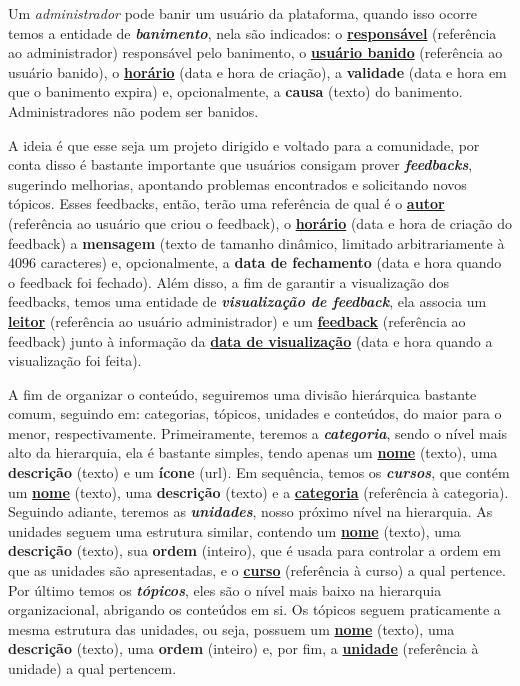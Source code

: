 
Um \textit{administrador} pode banir um usuário da plataforma, quando isso
ocorre temos a entidade de \textbf{\textit{banimento}}, nela são indicados: o
\textbf{\underline{responsável}} (referência ao administrador) responsável pelo
banimento, o \textbf{\underline{usuário banido}} (referência ao usuário
banido), o \textbf{\underline{horário}} (data e hora de criação), a
\textbf{validade} (data e hora em que o banimento expira) e, opcionalmente, a
\textbf{causa} (texto) do banimento. Administradores não podem ser banidos.


A ideia é que esse seja um projeto dirigido e voltado para a comunidade, por
conta disso é bastante importante que usuários consigam prover
\textbf{\textit{feedbacks}}, sugerindo melhorias, apontando problemas
encontrados e solicitando novos tópicos. Esses feedbacks, então, terão uma
referência de qual é o \textbf{\underline{autor}} (referência ao usuário que
criou o feedback), o \textbf{\underline{horário}} (data e hora de criação do
feedback) a \textbf{mensagem} (texto de tamanho dinâmico, limitado
arbitrariamente à 4096 caracteres) e, opcionalmente, a \textbf{data de
  fechamento} (data e hora quando o feedback foi fechado). Além disso, a fim de
garantir a visualização dos feedbacks, temos uma entidade de
\textbf{\textit{visualização de feedback}}, ela associa um
\textbf{\underline{leitor}} (referência ao usuário administrador) e um
\textbf{\underline{feedback}} (referência ao feedback) junto à informação da
\textbf{\underline{data de visualização}} (data e hora quando a visualização
foi feita).


A fim de organizar o conteúdo, seguiremos uma divisão hierárquica bastante
comum, seguindo em: categorias, tópicos, unidades e conteúdos, do maior para o
menor, respectivamente. Primeiramente, teremos a \textbf{\textit{categoria}},
sendo o nível mais alto da hierarquia, ela é bastante simples, tendo apenas um
\textbf{\underline{nome}} (texto), uma \textbf{descrição} (texto) e um
\textbf{ícone} (url). Em sequência, temos os \textbf{\textit{cursos}}, que
contém um \textbf{\underline{nome}} (texto), uma \textbf{descrição} (texto) e a
\textbf{\underline{categoria}} (referência à categoria). Seguindo adiante,
teremos as \textbf{\textit{unidades}}, nosso próximo nível na hierarquia. As
unidades seguem uma estrutura similar, contendo um \textbf{\underline{nome}}
(texto), uma \textbf{descrição} (texto), sua \textbf{ordem} (inteiro), que é
usada para controlar a ordem em que as unidades são apresentadas, e o
\textbf{\underline{curso}} (referência à curso) a qual pertence. Por último
temos os \textbf{\textit{tópicos}}, eles são o nível mais baixo na hierarquia
organizacional, abrigando os conteúdos em si. Os tópicos seguem praticamente a
mesma estrutura das unidades, ou seja, possuem um \textbf{\underline{nome}}
(texto), uma \textbf{descrição} (texto), uma \textbf{ordem} (inteiro) e, por
fim, a \textbf{\underline{unidade}} (referência à unidade) a qual pertencem.

